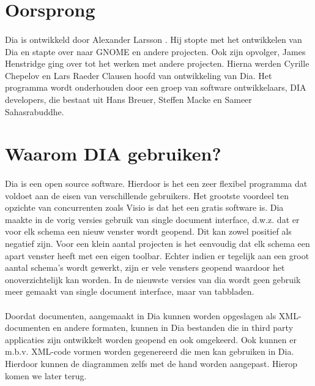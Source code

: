 \documentclass[12pt,a4paper]{report}
\begin{document}
\begin{flushleft}
\section{Oorsprong}
\paragraph*{}
Dia is ontwikkeld door Alexander Larsson . Hij stopte met het ontwikkelen van Dia en stapte over naar GNOME en andere projecten. Ook zijn opvolger, James Henstridge ging over tot het werken met andere projecten. Hierna werden Cyrille Chepelov en Lars Raeder Clausen hoofd van ontwikkeling van Dia. Het programma wordt onderhouden door een groep van software ontwikkelaars, DIA developers, die bestaat uit Hans Breuer, Steffen Macke en Sameer Sahasrabuddhe.
\section{Waarom DIA gebruiken?}
\paragraph*{}
Dia is een open source software. Hierdoor is het een zeer flexibel programma dat voldoet aan de eisen van verschillende gebruikers. Het grootste voordeel ten opzichte van concurrenten zoals Visio is dat het een gratis software is. Dia maakte in de vorig versies gebruik van single document interface, d.w.z. dat er voor elk schema een nieuw venster wordt geopend. Dit kan zowel positief als negatief zijn. Voor een klein aantal projecten is het eenvoudig dat elk schema een apart venster heeft met een eigen toolbar. Echter indien er tegelijk aan een groot aantal schema's wordt gewerkt, zijn er vele vensters geopend waardoor het onoverzichtelijk kan worden. In de nieuwste versies van dia wordt geen gebruik meer gemaakt van single document interface, maar van tabbladen.
\paragraph*{}
Doordat documenten, aangemaakt in Dia kunnen worden opgeslagen als XML-documenten en andere formaten, kunnen in Dia bestanden die in third party applicaties zijn ontwikkelt worden geopend en ook omgekeerd. Ook kunnen er m.b.v. XML-code vormen worden gegenereerd die men kan gebruiken in Dia. Hierdoor kunnen de diagrammen zelfs met de hand worden aangepast. Hierop komen we later terug.

\end{flushleft}
\end{document}
